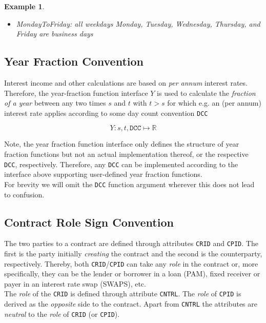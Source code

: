 \documentclass[9pt,oneside]{amsart}
\newtheorem{example}{Example}
\newcommand{\Real}{\mathbb{R}}
\newcommand{\attr}[1]{\texttt{#1}}
\newcommand{\yfrfunc}{Y}
\begin{document}
\begin{multicols}{2}
\begin{example}
\begin{itemize}
	\item MondayToFriday: all weekdays Monday, Tuesday, Wednesday, Thursday, and Friday are business days
\end{itemize}
\end{example}


\subsection{Year Fraction Convention}\label{sec:yearfrac}

Interest income and other calculations are based on \textit{per annum} interest rates. Therefore, the year-fraction function interface $Y$ is used to calculate the \textit{fraction of a year} between any two times $s$ and $t$ with $t>s$ for which e.g. an (per annum) interest rate applies according to some day count convention \attr{DCC}

\[
	\yfrfunc: s,t,\attr{DCC} \mapsto \Real
\]

Note, the year fraction function interface only defines the structure of year fraction functions but not an actual implementation thereof, or the respective \attr{DCC}, respectively. Therefore, any \attr{DCC} can be implemented according to the interface above supporting user-defined year fraction functions.\\

For brevity we will omit the \attr{DCC} function argument wherever this does not lead to confusion.


\subsection{Contract Role Sign Convention}\label{sec:cntrl}

The two parties to a contract are defined through attributes \attr{CRID} and \attr{CPID}. The first is the party initially \textit{creating} the contract and the second is the counterparty, respectively. Thereby, both \attr{CRID}/\attr{CPID} can take any \textit{role} in the contract or, more specifically, they can be the lender or borrower in a loan (PAM), fixed receiver or payer in an interest rate swap (SWAPS), etc.\\

The \textit{role} of the \attr{CRID} is defined through attribute \attr{CNTRL}. The \textit{role} of \attr{CPID} is derived as the \textit{opposite} side to the contract. Apart from \attr{CNTRL} the attributes are \textit{neutral} to the \textit{role} of \attr{CRID} (or \attr{CPID}).\\


\end{multicols}
\end{document}
